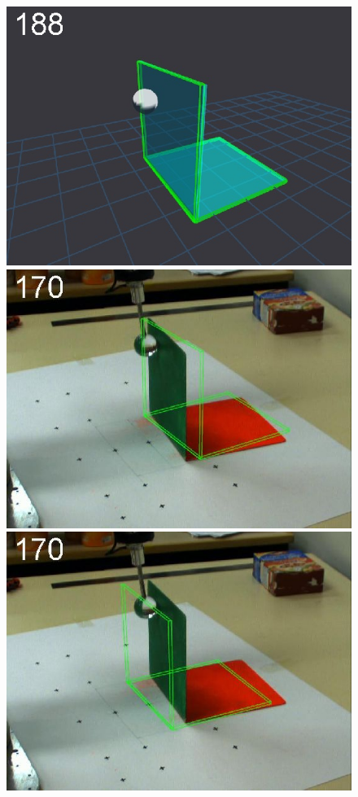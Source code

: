 \begin{figure}[tb]
{\includegraphics[width=\imgBXwid]{./B1_3exp_20_2}
\includegraphics[width=\imgBXwid]{./B2_2exp_58_2}
\includegraphics[width=\imgBXwid]{./B2_1exp_58_2}
}
\end{figure}
